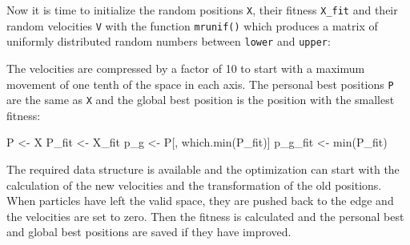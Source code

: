 \documentclass[
  oneside]{book}
\newenvironment{Shaded}{\begin{snugshade}}{\end{snugshade}}
\newcommand{\AttributeTok}[1]{\textcolor[rgb]{0.77,0.63,0.00}{#1}}
\newcommand{\ControlFlowTok}[1]{\textcolor[rgb]{0.13,0.29,0.53}{\textbf{#1}}}
\newcommand{\DecValTok}[1]{\textcolor[rgb]{0.00,0.00,0.81}{#1}}
\newcommand{\FunctionTok}[1]{\textcolor[rgb]{0.00,0.00,0.00}{#1}}
\newcommand{\NormalTok}[1]{#1}
\newcommand{\OtherTok}[1]{\textcolor[rgb]{0.56,0.35,0.01}{#1}}
\newcommand{\SpecialCharTok}[1]{\textcolor[rgb]{0.00,0.00,0.00}{#1}}
\begin{document}
Now it is time to initialize the random positions \texttt{X}, their fitness \texttt{X\_fit} and their random velocities \texttt{V} with the function \texttt{mrunif()} which produces a matrix of uniformly distributed random numbers between \texttt{lower} and \texttt{upper}:

\begin{Shaded}
\end{Shaded}

The velocities are compressed by a factor of 10 to start with a maximum movement of one tenth of the space in each axis. The personal best positions \texttt{P} are the same as \texttt{X} and the global best position is the position with the smallest fitness:

\begin{Shaded}
\begin{Highlighting}[]
\NormalTok{P }\OtherTok{\textless{}{-}}\NormalTok{ X}
\NormalTok{P\_fit }\OtherTok{\textless{}{-}}\NormalTok{ X\_fit}
\NormalTok{p\_g }\OtherTok{\textless{}{-}}\NormalTok{ P[, }\FunctionTok{which.min}\NormalTok{(P\_fit)]}
\NormalTok{p\_g\_fit }\OtherTok{\textless{}{-}} \FunctionTok{min}\NormalTok{(P\_fit)}
\end{Highlighting}
\end{Shaded}

The required data structure is available and the optimization can start with the calculation of the new velocities and the transformation of the old positions. When particles have left the valid space, they are pushed back to the edge and the velocities are set to zero. Then the fitness is calculated and the personal best and global best positions are saved if they have improved.
\end{document}
